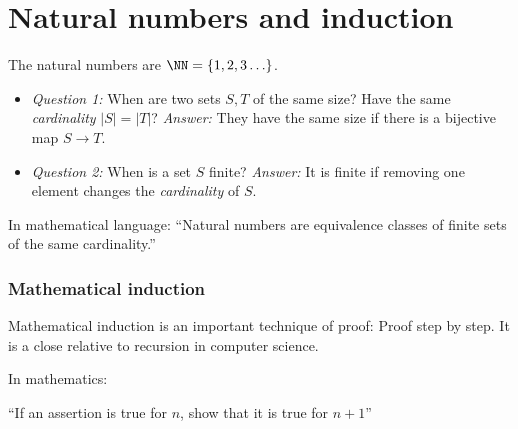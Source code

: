 \section{Natural numbers and induction}
The natural numbers are $\NN = \{1,2,3 \ldots \}$.


\begin{itemize}
 \item \emph{Question 1:} When are two sets $S,T$ of the same size?  Have the same \emph{cardinality} $|S|=|T|$?
 \emph{Answer:} They have the same size
 if there is a bijective map $S\to T$.
 \item \emph{Question 2:} When is a set $S$ finite? \emph{Answer:}
 It is finite if removing one element changes the \emph{cardinality} of $S$. 
 \white{3cm}{}
\end{itemize}

In mathematical language: ``Natural numbers are equivalence classes of finite sets of the same cardinality.'' 


\subsubsection{Mathematical induction}

Mathematical induction is an important technique of proof: Proof step by step. It is a close relative to 
recursion in computer science. 



In mathematics:

``If an assertion is true for $n$, show that it is true for $n+1$''


\white{3cm}{}


